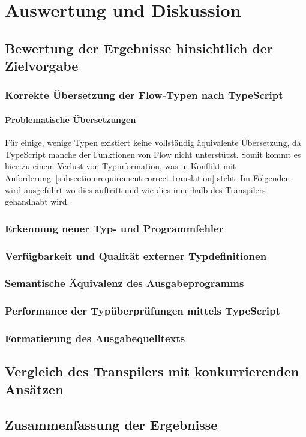 \chapter{Auswertung und Diskussion}
\label{chap:evaluation}


\section{Bewertung der Ergebnisse hinsichtlich der Zielvorgabe}

\subsection{Korrekte Übersetzung der Flow-Typen nach TypeScript}

\subsubsection{Problematische Übersetzungen}

Für einige, wenige Typen existiert keine vollständig äquivalente Übersetzung, da TypeScript manche der Funktionen von Flow nicht unterstützt. Somit kommt es hier zu einem Verlust von Typinformation, was in Konflikt mit Anforderung~\ref{subsection:requirement:correct-translation} steht. Im Folgenden wird ausgeführt wo dies auftritt und wie dies innerhalb des Transpilers gehandhabt wird.

\subsection{Erkennung neuer Typ- und Programmfehler}

\subsection{Verfügbarkeit und Qualität externer Typdefinitionen}

\subsection{Semantische Äquivalenz des Ausgabeprogramms}

\subsection{Performance der Typüberprüfungen mittels TypeScript}

\subsection{Formatierung des Ausgabequelltexts}

\section{Vergleich des Transpilers mit konkurrierenden Ansätzen}

\section{Zusammenfassung der Ergebnisse}
